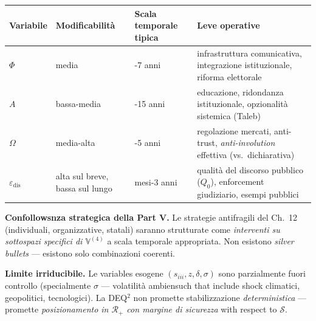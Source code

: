 {\def\LTcaptype{none} %
{\small\begin{longtable}[]{@{}
  >{\raggedright\arraybackslash}p{}
  >{\raggedright\arraybackslash}p{}
  >{\raggedright\arraybackslash}p{}
  >{\raggedright\arraybackslash}p{}@{}}
\toprule\noalign{}
\begin{minipage}[b]{\linewidth}\raggedright
Variabile
\end{minipage} & \begin{minipage}[b]{\linewidth}\raggedright
Modificabilità
\end{minipage} & \begin{minipage}[b]{\linewidth}\raggedright
Scala temporale tipica
\end{minipage} & \begin{minipage}[b]{\linewidth}\raggedright
Leve operative
\end{minipage} \\
\midrule\noalign{}
\endhead
\bottomrule\noalign{}
\endlastfoot
\(\Phi\) & media & 3-7 anni & infrastruttura comunicativa, integrazione
istituzionale, riforma elettorale \\
\(A\) & bassa-media & 5-15 anni & educazione, ridondanza istituzionale,
opzionalità sistemica (Taleb) \\
\(\Omega\) & media-alta & 1-5 anni & regolazione mercati, anti-trust,
\emph{anti-involution} effettiva (vs.~dichiarativa) \\
\(\varepsilon_{\text{dis}}\) & alta sul breve, bassa sul lungo & 6
mesi-3 anni & qualità del discorso pubblico (\(Q_0\)), enforcement
giudiziario, esempi pubblici \\
\end{longtable}}
}

\Proved{} \textbf{Confollowsnza strategica della Part V.} Le strategie
antifragili del Ch.~12 (individuali, organizzative, statali) saranno
strutturate come \emph{interventi su sottospazi specifici di
\(\mathbb{V}^{(4)}\)} a scala temporale appropriata. Non esistono
\emph{silver bullets} --- esistono solo combinazioni coerenti.

\Conj{} \textbf{Limite irriducibile.} Le variables esogene
\((s_{iii}, z, \delta, \sigma)\) sono parzialmente fuori controllo
(specialmente \(\sigma\) --- volatilità ambiensuch that include shock
climatici, geopolitici, tecnologici). La DEQ$^2$ non promette
stabilizzazione \emph{deterministica} --- promette \emph{posizionamento
in \(\mathcal{R}_+\) con margine di sicurezza} with respect to
\(\mathcal{S}\).



